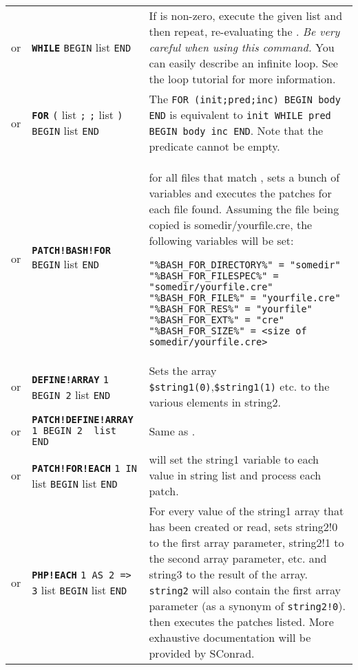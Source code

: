 \documentclass{article}
\def\ttref#1{\ahrefloc{#1}{\tt #1}}
\def\DEFINE#1{{\tt \bf #1}\label{#1}\index{#1}}
\def\DEFSYN#1{{\tt \bf #1}\index{#1}}
\def\t#1{{\tt #1}}
\def\Slist{{\color{red} list }}
\begin{document}
\begin{tabular}{cp{10in}|p{10in}}
or & \DEFSYN{WHILE} \ttref{value} \t{BEGIN}
  \ttref{patch} \Slist \t{END} &
  If \ttref{value} is non-zero, execute the given \ttref{patch} \Slist and
  then repeat, re-evaluating the \ttref{value}.
  {\em Be very careful when using this command. } You can easily describe
  an infinite loop. See the \ttref{WHILE} loop tutorial for more
  information.
  \\
or & \DEFINE{FOR} \t{(} \ttref{patch} \Slist \t{;}
                        \ttref{value} \t{;}
                        \ttref{patch} \Slist \t{)}
                  \t{BEGIN} \ttref{patch} \Slist \t{END} &
  The \ttref{patch} \t{FOR (init;pred;inc) BEGIN body END} is equivalent to
  \t{init WHILE pred BEGIN body inc END}. Note that the predicate
  \ttref{value} cannot be empty.  \\
or & \DEFINE{PATCH!BASH!FOR} \ttref{directory-file-regexp} \t{BEGIN} \ttref{patch} \Slist \t{END} &
  for all files that match \ttref{directory-file-regexp}, sets a bunch of variables
  and executes the patches for each file found. Assuming the file being copied
  is somedir/yourfile.cre, the following variables will be set:
\begin{verbatim}
"%BASH_FOR_DIRECTORY%" = "somedir"
"%BASH_FOR_FILESPEC%" = "somedir/yourfile.cre"
"%BASH_FOR_FILE%" = "yourfile.cre"
"%BASH_FOR_RES%" = "yourfile"
"%BASH_FOR_EXT%" = "cre"
"%BASH_FOR_SIZE%" = <size of somedir/yourfile.cre>
\end{verbatim}            \\

or & \DEFINE{DEFINE!ARRAY} \t{\ttref{String}1 BEGIN \ttref{String}2} \Slist \t{END} &
	Sets the array \verb+$string1(0)+,\verb+$string1(1)+ etc. to the various elements in string2.
\\

or & \DEFINE{PATCH!DEFINE!ARRAY} \t{\ttref{String}1 BEGIN \ttref{String}2 \Slist END} &
	Same as \ttref{DEFINE!ARRAY}.
\\


or & \DEFINE{PATCH!FOR!EACH} \t{\ttref{String}1 IN \ttref{String}} \Slist
                             \t{BEGIN} \ttref{patch} \Slist \t{END} &
    will set the string1 variable to each value in string list and process each patch. \\

or & \DEFINE{PHP!EACH} \t{\ttref{String}1 AS \ttref{String}2 => \ttref{String}3} \Slist
                       \t{BEGIN} \ttref{patch} \Slist \t{END} &
    For every value of the string1 array that has been created or read, sets
    string2!0 to the first array parameter, string2!1 to the second array
    parameter, etc. and string3 to the result of the array. \verb+string2+ will also contain
		the first array parameter (as a synonym of \verb+string2!0+). then executes the
    patches listed. More exhaustive documentation will be provided by SConrad.
\\


\end{tabular}
\end{document}
